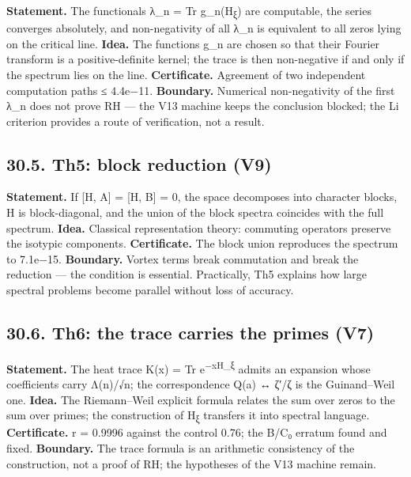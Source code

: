 \documentclass[11pt,a4paper]{article}
\begin{document}
\textbf{Statement.} The functionals λ\_n = Tr g\_n(H\textsubscript{ξ}) are computable, the series converges absolutely, and non-negativity of all λ\_n is equivalent to all zeros lying on the critical line. \textbf{Idea.} The functions g\_n are chosen so that their Fourier transform is a positive-definite kernel; the trace is then non-negative if and only if the spectrum lies on the line. \textbf{Certificate.} Agreement of two independent computation paths ≤ 4.4e−11. \textbf{Boundary.} Numerical non-negativity of the first λ\_n does not prove RH — the V13 machine keeps the conclusion blocked; the Li criterion provides a route of verification, not a result.

\subsection{30.5. Th5: block reduction (V9)}

\textbf{Statement.} If [H, A] = [H, B] = 0, the space decomposes into character blocks, H is block-diagonal, and the union of the block spectra coincides with the full spectrum. \textbf{Idea.} Classical representation theory: commuting operators preserve the isotypic components. \textbf{Certificate.} The block union reproduces the spectrum to 7.1e−15. \textbf{Boundary.} Vortex terms break commutation and break the reduction — the condition is essential. Practically, Th5 explains how large spectral problems become parallel without loss of accuracy.

\subsection{30.6. Th6: the trace carries the primes (V7)}

\textbf{Statement.} The heat trace K(x) = Tr e\textsuperscript{−xH\_ξ} admits an expansion whose coefficients carry Λ(n)/√n; the correspondence Q(a) ↔ ζ′/ζ is the Guinand–Weil one. \textbf{Idea.} The Riemann–Weil explicit formula relates the sum over zeros to the sum over primes; the construction of H\textsubscript{ξ} transfers it into spectral language. \textbf{Certificate.} r = 0.9996 against the control 0.76; the B/C₀ erratum found and fixed. \textbf{Boundary.} The trace formula is an arithmetic consistency of the construction, not a proof of RH; the hypotheses of the V13 machine remain.

\begin{center}\end{center}
\end{document}
